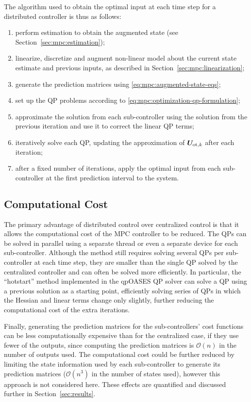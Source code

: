 The algorithm used to obtain the optimal input at each time step for a distributed controller is thus as follows:

\begin{enumerate}
  \item perform estimation to obtain the augmented state (see Section~\ref{sec:mpc:estimation});
  \item linearize, discretize and augment non-linear model about the current state estimate and previous inputs, as described in Section~\ref{sec:mpc:linearization};
  \item generate the prediction matrices using \eqref{eq:mpc:augmented-state-eqs};
  \item set up the QP problems according to \eqref{eq:mpc:optimization-qp-formulation};
  \item approximate the solution from each sub-controller using the solution from the previous iteration and use it to correct the linear QP terms;
  \item iteratively solve each QP, updating the approximation of  $\bm{U}_{\text{ot},k}$ after each iteration;
  \item after a fixed number of iterations, apply the optimal input from each sub-controller at the first prediction interval to the system.
\end{enumerate}

\subsection{Computational Cost}

The primary advantage of distributed control over centralized control is that it allows the computational cost of the MPC controller to be reduced.
The QPs can be solved in parallel using a separate thread or even a separate device for each sub-controller.
Although the method still requires solving several QPs per sub-controller at each time step, they are smaller than the single QP solved by the centralized controller and can often be solved more efficiently.
In particular, the ``hotstart'' method implemented in the qpOASES QP solver can solve a QP using a previous solution as a starting point, efficiently solving series of QPs in which the Hessian and linear terms change only slightly, further reducing the computational cost of the extra iterations.

Finally, generating the prediction matrices for the sub-controllers' cost functions can be less computationally expensive than for the centralized case, if they use fewer of the outputs, since computing the prediction matrices is $\mathcal{O}(n)$ in the number of outputs used.
The computational cost could be further reduced by limiting the state information used by each sub-controller to generate its prediction matrices ($\mathcal{O}(n^3)$ in the number of states used), however this approach is not considered here.
These effects are quantified and discussed further in Section~\ref{sec:results}.

